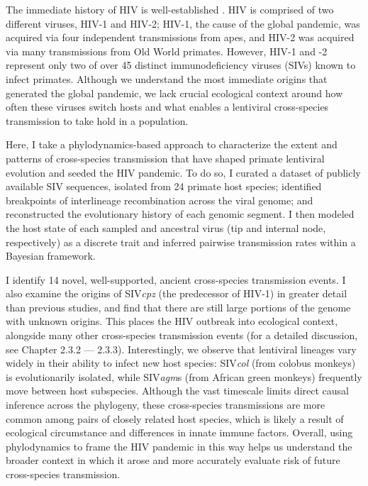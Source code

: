 The immediate history of HIV is well-established \citep{sharp2011origins}.
HIV is comprised of two different viruses, HIV-1 and HIV-2; HIV-1, the cause of the global pandemic, was acquired via four independent transmissions from apes, and HIV-2 was acquired via many transmissions from Old World primates.
However, HIV-1 and -2 represent only two of over 45 distinct immunodeficiency viruses (SIVs) known to infect primates.
Although we understand the most immediate origins that generated the global pandemic, we lack crucial ecological context around how often these viruses switch hosts and what enables a lentiviral cross-species transmission to take hold in a population.

Here, I take a phylodynamics-based approach to characterize the extent and patterns of cross-species transmission that have shaped primate lentiviral evolution and seeded the HIV pandemic.
To do so, I curated a dataset of publicly available SIV sequences, isolated from 24 primate host species; identified breakpoints of interlineage recombination across the viral genome; and reconstructed the evolutionary history of each genomic segment.
I then modeled the host state of each sampled and ancestral virus (tip and internal node, respectively) as a discrete trait and inferred pairwise transmission rates within a Bayesian framework.

I identify 14 novel, well-supported, ancient cross-species transmission events.
I also examine the origins of SIV\textit{cpz} (the predecessor of HIV-1) in greater detail than previous studies, and find that there are still large portions of the genome with unknown origins.
This places the HIV outbreak into ecological context, alongside many other cross-species transmission events (for a detailed discussion, see Chapter 2.3.2 --- 2.3.3).
Interestingly, we observe that lentiviral lineages vary widely in their ability to infect new host species: SIV\textit{col} (from colobus monkeys) is evolutionarily isolated, while SIV\textit{agm}s (from African green monkeys) frequently move between host subspecies.
Although the vast timescale limits direct causal inference across the phylogeny, these cross-species transmissions are more common among pairs of closely related host species, which is likely a result of ecological circumstance and differences in innate immune factors.
Overall, using phylodynamics to frame the HIV pandemic in this way helps us understand the broader context in which it arose and more accurately evaluate risk of future cross-species transmission.

